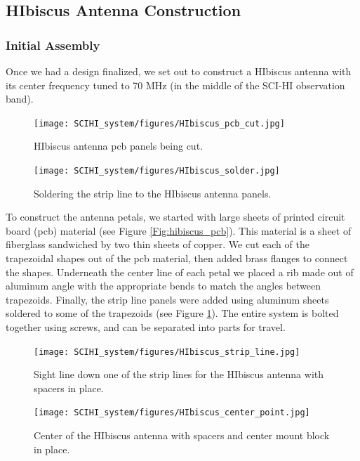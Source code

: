 \subsection{HIbiscus Antenna Construction}

\subsubsection{Initial Assembly}
Once we had a design finalized, we set out to construct a HIbiscus antenna with its center frequency tuned to 70 MHz (in the middle of the SCI-HI observation band).

\begin{figure}[htb]
\centering
\begin{minipage}[b]{0.40\textwidth}
\centering
\texttt{[image: SCIHI\_system/figures/HIbiscus\_pcb\_cut.jpg]}
\caption{HIbiscus antenna pcb panels being cut. }
\label{Fig:hibiscus_pcb}
\end{minipage}%
\begin{minipage}[b]{0.02\textwidth}
\hspace{1cm}
\end{minipage}%
\begin{minipage}[b]{0.54\textwidth}
\centering
\texttt{[image: SCIHI\_system/figures/HIbiscus\_solder.jpg]}
\caption{Soldering the strip line to the HIbiscus antenna panels.}
\label{Fig:hibiscus_solder}
\end{minipage}
\end{figure} 

To construct the antenna petals, we started with large sheets of printed circuit board (pcb) material (see Figure \ref{Fig:hibiscus_pcb}). This material is a sheet of fiberglass sandwiched by two thin sheets of copper. We cut each of the trapezoidal shapes out of the pcb material, then added brass flanges to connect the shapes. Underneath the center line of each petal we placed a rib made out of aluminum angle with the appropriate bends to match the angles between trapezoids. Finally, the strip line panels were added using aluminum sheets soldered to some of the trapezoids (see Figure \ref{Fig:hibiscus_solder}). The entire system is bolted together using screws, and can be separated into parts for travel. 

\begin{figure}[htb]
\centering
\begin{minipage}[b]{0.52\textwidth}
\centering
\texttt{[image: SCIHI\_system/figures/HIbiscus\_strip\_line.jpg]}
\caption{Sight line down one of the strip lines for the HIbiscus antenna with spacers in place.}
\label{Fig:hibiscus_spacer}
\end{minipage}%
\begin{minipage}[b]{0.02\textwidth}
\hspace{1cm}
\end{minipage}%
\begin{minipage}[b]{0.42\textwidth}
\centering
\texttt{[image: SCIHI\_system/figures/HIbiscus\_center\_point.jpg]}
\caption{Center of the HIbiscus antenna with spacers and center mount block in place.}
\label{Fig:hibiscus_center}
\end{minipage}
\end{figure}

